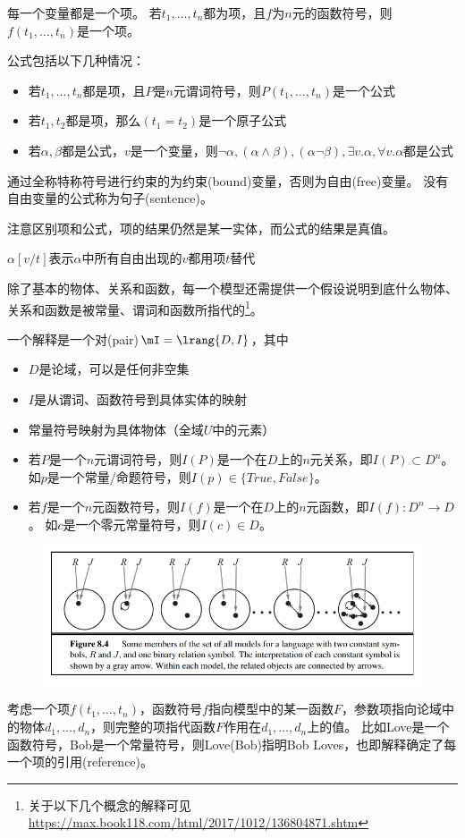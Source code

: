 \begin{definition}[项(term)]
每一个变量都是一个项。
若$t_1,\ldots,t_n$都为项，且$f$为$n$元的函数符号，则$f(t_1,\ldots,t_n)$是一个项。
\end{definition}
\begin{definition}[公式(formular)]
公式包括以下几种情况：
\begin{itemize}
\item 若$t_1,\ldots,t_n$都是项，且$P$是$n$元谓词符号，则$P(t_1,\ldots,t_n)$是一个公式
\item 若$t_1,t_2$都是项，那么$(t_1=t_2)$是一个原子公式
\item 若$\alpha,\beta$都是公式，$v$是一个变量，则$\lnot\alpha,(\alpha\land\beta),(\alpha\lnot\beta),\exists v.\alpha,\forall v.\alpha$都是公式
\end{itemize}
通过全称特称符号进行约束的为约束(bound)变量，否则为自由(free)变量。
没有自由变量的公式称为句子(sentence)。
\end{definition}
注意区别项和公式，项的结果仍然是某一实体，而公式的结果是真值。

\begin{definition}[替换]
$\alpha[v/t]$表示$\alpha$中所有自由出现的$v$都用项$t$替代
\end{definition}

除了基本的物体、关系和函数，每一个模型还需提供一个假设说明到底什么物体、关系和函数是被常量、谓词和函数所指代的\footnote{关于以下几个概念的解释可见\url{https://max.book118.com/html/2017/1012/136804871.shtm}}。
\begin{definition}[解释(interpretation)]
一个解释是一个对(pair)$\mI=\lrang{D,I}$，其中
\begin{itemize}
	\item $D$是论域，可以是任何非空集
	\item $I$是从谓词、函数符号到具体实体的映射
	\item 常量符号映射为具体物体（全域$U$中的元素）
	\item 若$P$是一个$n$元谓词符号，则$I(P)$是一个在$D$上的$n$元关系，即$I(P)\subset D^n$。
	如$p$是一个常量/命题符号，则$I(p)\in\{True,False\}$。
	\item 若$f$是一个$n$元函数符号，则$I(f)$是一个在$D$上的$n$元函数，即$I(f):D^n\to D$。
	如$c$是一个零元常量符号，则$I(c)\in D$。
\end{itemize}
\end{definition}
\begin{figure}[H]
\centering
\includegraphics[width=0.8\linewidth]{fig/interpretation.png}
\end{figure}
考虑一个项$f(t_1,\ldots,t_n)$，函数符号$f$指向模型中的某一函数$F$，参数项指向论域中的物体$d_1,\ldots,d_n$，则完整的项指代函数$F$作用在$d_1,\ldots,d_n$上的值。
比如Love是一个函数符号，Bob是一个常量符号，则Love(Bob)指明Bob Loves，也即解释确定了每一个项的引用(reference)。

